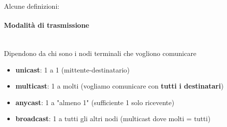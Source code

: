 Alcune definizioni:

\paragraph{Modalit\`a di trasmissione}~\\

Dipendono da chi sono i nodi terminali che vogliono comunicare
\begin{itemize}
  \item \textbf{unicast}: 1 a 1 (mittente-destinatario)
  \item \textbf{multicast}: 1 a molti (vogliamo comunicare con \textbf{tutti i destinatari})
  \item \textbf{anycast}: 1 a "almeno 1" (sufficiente 1 solo ricevente)
  \item \textbf{broadcast}: 1 a tutti gli altri nodi (multicast dove molti = tutti)
\end{itemize}



